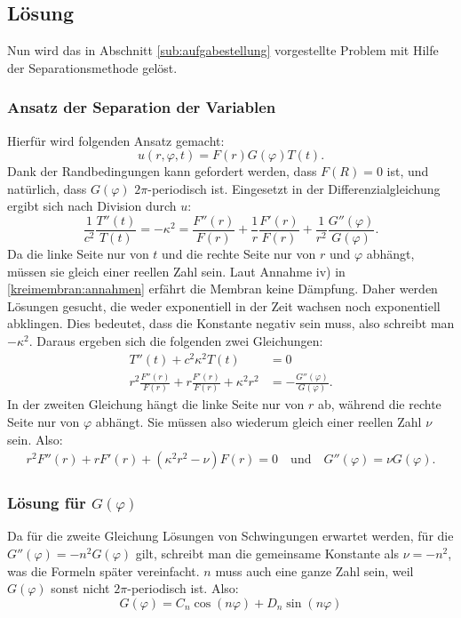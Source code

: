 \subsection{Lösung\label{sub:lösung1}}
Nun wird das in Abschnitt \ref{sub:aufgabestellung} vorgestellte Problem mit Hilfe der Separationsmethode gelöst.
\subsubsection{Ansatz der Separation der Variablen\label{subsub:ansatz_separation}}
Hierfür wird folgenden Ansatz gemacht:
\begin{equation*}
	u(r,\varphi, t) = F(r)G(\varphi)T(t).
\end{equation*}
Dank der Randbedingungen kann gefordert werden, dass $F(R)=0$ ist, und natürlich, dass $G(\varphi)$ $2\pi$-periodisch ist. Eingesetzt in der Differenzialgleichung ergibt sich nach Division durch $u$:
\begin{equation*}
	\frac{1}{c^2}\frac{T''(t)}{T(t)}=-\kappa^2=\frac{F''(r)}{F(r)}+\frac{1}{r}\frac{F'(r)}{F(r)}+\frac{1}{r^2}\frac{G''(\varphi)}{G(\varphi)}.
\end{equation*}
Da die linke Seite nur von $t$ und die rechte Seite nur von $r$ und $\varphi$ abhängt, müssen sie gleich einer reellen Zahl sein. 
Laut Annahme iv) in \ref{kreimembran:annahmen} erfährt die Membran keine Dämpfung.
Daher werden Lösungen gesucht, die weder exponentiell in der Zeit wachsen noch exponentiell abklingen. 
Dies bedeutet, dass die Konstante negativ sein muss, also schreibt man $-\kappa^2$. Daraus ergeben sich die folgenden zwei Gleichungen:
\begin{align*}
	T''(t) + c^2\kappa^2T(t) &= 0\\
	r^2\frac{F''(r)}{F(r)} + r \frac{F'(r)}{F(r)} +\kappa^2 r^2 &= - \frac{G''(\varphi)}{G(\varphi)}.
\end{align*}
In der zweiten Gleichung hängt die linke Seite nur von $r$ ab, während die rechte Seite nur von $\varphi$ abhängt. Sie müssen also wiederum gleich einer reellen Zahl $\nu$ sein. Also:
\begin{align*}
	r^2F''(r) + rF'(r) + (\kappa^2 r^2 - \nu)F(r) = 0 \quad \text{und} \quad
	G''(\varphi) = \nu G(\varphi).
\end{align*}

\subsubsection{Lösung für $G(\varphi)$\label{subsub:lösung_G}}
Da für die zweite Gleichung Lösungen von Schwingungen erwartet werden, für die $G''(\varphi)=-n^2 G(\varphi)$ gilt, schreibt man die gemeinsame Konstante als $\nu=-n^2$, was die Formeln später vereinfacht. $n$ muss auch eine ganze Zahl sein, weil  $G(\varphi)$ sonst nicht $2\pi$-periodisch ist. Also:
\begin{equation*}
 G(\varphi) = C_n \cos(n\varphi) + D_n \sin(n\varphi)
 \label{eq:cos_sin_überlagerung}
\end{equation*}

